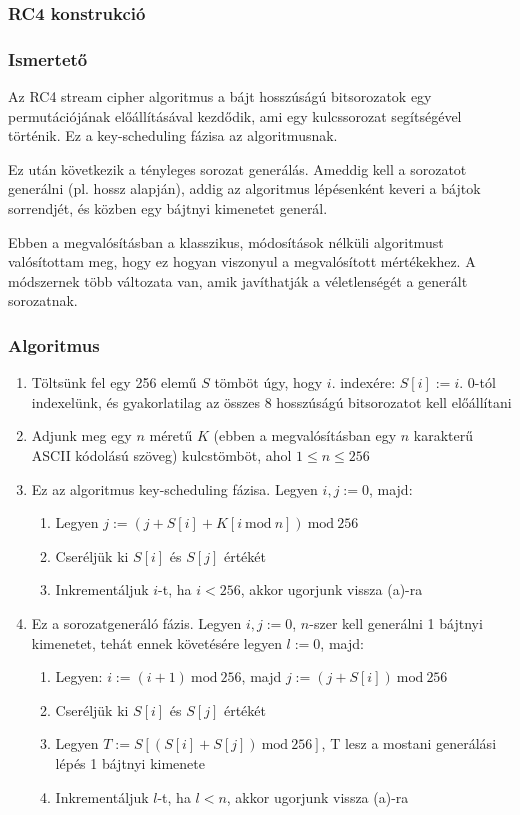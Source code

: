 \documentclass[hidelinks, 12pt]{article}
\begin{document}
	\subsubsection{RC4 konstrukció}
	\subsubsection*{Ismertető}
	Az RC4 stream cipher algoritmus a bájt hosszúságú bitsorozatok egy permutációjának előállításával kezdődik, ami egy kulcssorozat segítségével történik. Ez a key-scheduling fázisa az algoritmusnak.
	\par
	Ez után következik a tényleges sorozat generálás. Ameddig kell a sorozatot generálni (pl. hossz alapján), addig az algoritmus lépésenként keveri a bájtok sorrendjét, és közben egy bájtnyi kimenetet generál.
	\par
	Ebben a megvalósításban a klasszikus, módosítások nélküli algoritmust valósítottam meg, hogy ez hogyan viszonyul a megvalósított mértékekhez.
	A módszernek több változata van, amik javíthatják a véletlenségét a generált sorozatnak.
	\subsubsection*{Algoritmus}
	\begin{enumerate}
		\item Töltsünk fel egy 256 elemű $S$ tömböt úgy, hogy $i$. indexére: $S[i]:=i$. 0-tól indexelünk, és gyakorlatilag az összes 8 hosszúságú bitsorozatot kell előállítani
		\item Adjunk meg egy $n$ méretű $K$ (ebben a megvalósításban egy $n$ karakterű ASCII kódolású szöveg) kulcstömböt, ahol $1 \leq n \leq 256$
		\item Ez az algoritmus key-scheduling fázisa. Legyen $i, j:=0$, majd:
			\begin{enumerate}
				\item Legyen $j:=(j+S[i]+K[i \ \textrm{mod}\ n]) \ \textrm{mod} \ 256$
				\item Cseréljük ki $S[i]$ és $S[j]$ értékét
				\item Inkrementáljuk $i$-t, ha $i < 256$, akkor ugorjunk vissza (a)-ra
			\end{enumerate}
		\item Ez a sorozatgeneráló fázis. Legyen $i, j := 0$, $n$-szer kell generálni 1 bájtnyi kimenetet, tehát ennek követésére legyen $l:=0$, majd:
		\begin{enumerate}
			\item Legyen: $i := (i+1) \ \textrm{mod} \ 256$, majd $j := (j + S[i]) \ \textrm{mod} \ 256$
			\item Cseréljük ki $S[i]$ és $S[j]$ értékét
			\item Legyen $T := S[(S[i] + S[j]) \ \textrm{mod} \ 256]$, T lesz a mostani generálási lépés 1 bájtnyi kimenete
			\item Inkrementáljuk $l$-t, ha $l < n$, akkor ugorjunk vissza (a)-ra
		\end{enumerate}
	\end{enumerate}
\end{document}
